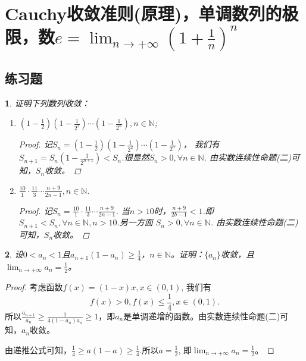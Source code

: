 \documentclass[utf8]{book}
\newtheorem{example}{}[section]             %
\begin{document}
\section{Cauchy收敛准则(原理)，单调数列的极限，数$e=\displaystyle \lim_{n\to +\infty}\left(1+\frac{1}{n}\right)^n$}
\subsection{练习题}
\begin{example}
证明下列数列收敛：
\renewcommand\labelenumi{\normalfont(\theenumi)}
\begin{enumerate}
\item $\displaystyle\left(1-\frac{1}{2}\right)\left(1-\frac{1}{2^2}\right)\cdots\left(1-\frac{1}{2^n}\right), n\in\mathbb{N}$;

\begin{proof}
记$S_n = \left(1-\frac{1}{2}\right)\left(1-\frac{1}{2^2}\right)\cdots\left(1-\frac{1}{2^n}\right)$， 我们有$S_{n+1} = S_n\left(1-\frac{1}{2^{n+1}}\right) < 
S_n$.很显然$S_n > 0,\forall n\in\mathbb{N}$. 由实数连续性命题(二)可知，$S_n$收敛。
\end{proof}

\item $\displaystyle\frac{10}{1}\cdot\frac{11}{3}\cdots\frac{n+9}{2n-1}, n\in\mathbb{N}$.

\begin{proof}
记$S_n = \frac{10}{1}\cdot\frac{11}{3}\cdots\frac{n+9}{2n-1}$. 当$n>10$时，$\frac{n+9}{2b-1} < 1$.即$S_{n+1} < S_{n},\forall n \in \mathbb{N}, n > 10$.另一方面
$S_n > 0, \forall n\in\mathbb{N}$. 由实数连续性命题(二)可知，$S_n$收敛。
\end{proof}
\end{enumerate}
\end{example}
\begin{example}
设$0<a_n<1$且$a_{n+1}(1-a_n)\geq \frac{1}{4}$，$n\in\mathbb{N}$。证明：$\{a_n\}$收敛，且$\displaystyle \lim_{n\to +\infty}a_n = \frac{1}{2}$。
\end{example}
\begin{proof}
考虑函数$f(x) = (1-x)x, x\in (0,1)$, 我们有$$f(x) > 0, f(x) \leq \frac{1}{4}, x\in (0,1).$$
所以$\displaystyle\frac{a_{n+1}}{a_n} \geq \frac{1}{4(1-a_n)a_n} \geq 1$，即$a_n$是单调递增的函数。由实数连续性命题(二)可知，$a_n$收敛。

由递推公式可知，$\frac{1}{4}\geq a(1-a)\geq \frac{1}{4}$.所以$a=\frac{1}{2}$, 即$\displaystyle \lim_{n\to +\infty}a_n = \frac{1}{2}$。
\end{proof}
\end{document}
